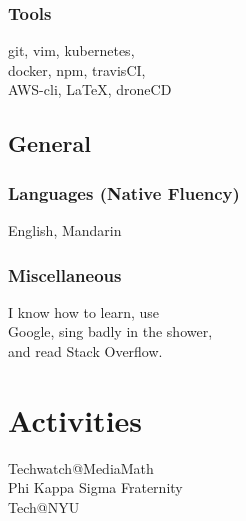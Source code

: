 \documentclass[]{two-column-resume}
\begin{document}
\begin{minipage}[t]{0.34\textwidth}
\subsubsection{Tools}
git, vim, kubernetes,\\
docker, npm, travisCI,\\
AWS-cli, \LaTeX, droneCD

\sectionsep

\subsection{General}
\subsubsection{Languages (Native Fluency)}
English, Mandarin
\newline

\subsubsection{Miscellaneous}
I know how to learn, use\\
Google, sing badly in the shower, \\
and read Stack Overflow.
\setlength{\parindent}{0ex}
\sectionsep

\section{Activities}
Techwatch@MediaMath \\
Phi Kappa Sigma Fraternity \\
Tech@NYU \\
\sectionsep




\end{minipage} 
\end{document}

